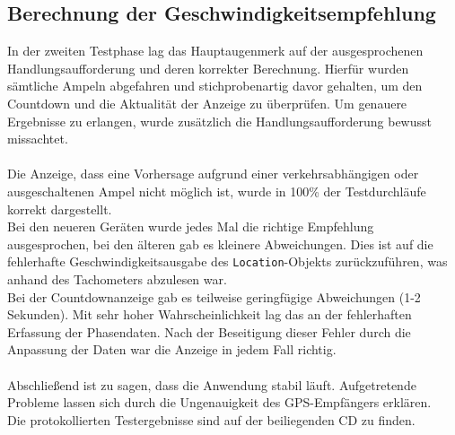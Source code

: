\subsection{Berechnung der Geschwindigkeitsempfehlung}
In der zweiten Testphase lag das Hauptaugenmerk auf der ausgesprochenen Handlungsaufforderung und deren korrekter Berechnung. Hierfür wurden sämtliche Ampeln abgefahren und stichprobenartig davor gehalten, um den Countdown und die Aktualität der Anzeige zu überprüfen. Um genauere Ergebnisse zu erlangen, wurde zusätzlich die Handlungsaufforderung bewusst missachtet.\\\\  
Die Anzeige, dass eine Vorhersage aufgrund einer verkehrsabhängigen oder ausgeschaltenen Ampel nicht möglich ist, wurde in 100\% der Testdurchläufe korrekt dargestellt.\\ 
Bei den neueren Geräten wurde jedes Mal die richtige Empfehlung ausgesprochen, bei den älteren gab es kleinere Abweichungen. Dies ist auf die fehlerhafte Geschwindigkeitsausgabe des \texttt{Location}-Objekts zurückzuführen, was anhand des Tachometers abzulesen war. \\
Bei der Countdownanzeige gab es teilweise geringfügige Abweichungen (1-2 Sekunden). Mit sehr hoher Wahrscheinlichkeit lag das an der fehlerhaften Erfassung der Phasendaten. Nach der Beseitigung dieser Fehler durch die Anpassung der Daten war die Anzeige in jedem Fall richtig.\\\\
Abschließend ist zu sagen, dass die Anwendung stabil läuft. Aufgetretende Probleme lassen sich durch die Ungenauigkeit des \gls{GPS}-Empfängers erklären.\\
Die protokollierten Testergebnisse sind auf der beiliegenden CD zu finden.
